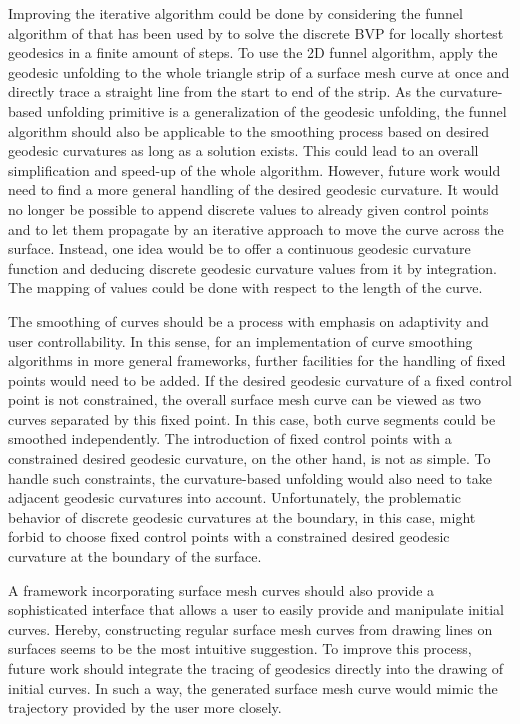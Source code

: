 \documentclass[crop=false]{stdlocal}
\begin{document}
  Improving the iterative algorithm could be done by considering the funnel algorithm of \textcite{lee1984} that has been used by \textcite{mancinelli2022} to solve the discrete BVP for locally shortest geodesics in a finite amount of steps.
  To use the 2D funnel algorithm, \textcite{mancinelli2022} apply the geodesic unfolding to the whole triangle strip of a surface mesh curve at once and directly trace a straight line from the start to end of the strip.
  As the curvature-based unfolding primitive is a generalization of the geodesic unfolding, the funnel algorithm should also be applicable to the smoothing process based on desired geodesic curvatures as long as a solution exists.
  This could lead to an overall simplification and speed-up of the whole algorithm.
  However, future work would need to find a more general handling of the desired geodesic curvature.
  It would no longer be possible to append discrete values to already given control points and to let them propagate by an iterative approach to move the curve across the surface.
  Instead, one idea would be to offer a continuous geodesic curvature function and deducing discrete geodesic curvature values from it by integration.
  The mapping of values could be done with respect to the length of the curve.

  The smoothing of curves should be a process with emphasis on adaptivity and user controllability.
  In this sense, for an implementation of curve smoothing algorithms in more general frameworks, further facilities for the handling of fixed points would need to be added.
  If the desired geodesic curvature of a fixed control point is not constrained, the overall surface mesh curve can be viewed as two curves separated by this fixed point.
  In this case, both curve segments could be smoothed independently.
  The introduction of fixed control points with a constrained desired geodesic curvature, on the other hand, is not as simple.
  To handle such constraints, the curvature-based unfolding would also need to take adjacent geodesic curvatures into account.
  Unfortunately, the problematic behavior of discrete geodesic curvatures at the boundary, in this case, might forbid to choose fixed control points with a constrained desired geodesic curvature at the boundary of the surface.

  A framework incorporating surface mesh curves should also provide a sophisticated interface that allows a user to easily provide and manipulate initial curves.
  Hereby, constructing regular surface mesh curves from drawing lines on surfaces seems to be the most intuitive suggestion.
  To improve this process, future work should integrate the tracing of geodesics directly into the drawing of initial curves.
  In such a way, the generated surface mesh curve would mimic the trajectory provided by the user more closely.
\end{document}
